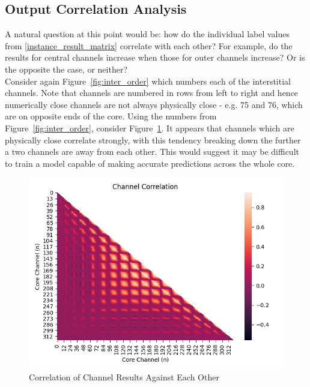 \subsection{Output Correlation Analysis} \label{correlation}

\noindent A natural question at this point would be: how do the individual label values from \ref{instance_result_matrix} correlate with each other? For example, do the results for central channels increase when those for outer channels increase? Or is the opposite the case, or neither? \\

\noindent Consider again Figure~\ref{fig:inter_order} which numbers each of the interstitial channels. Note that channels are numbered in rows from left to right and hence numerically close channels are not always physically close - e.g. 75 and 76, which are on opposite ends of the core. Using the numbers from Figure~\ref{fig:inter_order}, consider Figure~\ref{fig:channel_correlations}. It appears that channels which are physically close correlate strongly, with this tendency breaking down the further a two channels are away from each other. This would suggest it may be difficult to train a model capable of making accurate predictions across the whole core.
\\

\begin{figure}[h]
	\centering
	\includegraphics[scale=0.75]{Figures/channels_correlation.png}
	\caption{Correlation of Channel Results Against Each Other}
	\label{fig:channel_correlations}
\end{figure}

